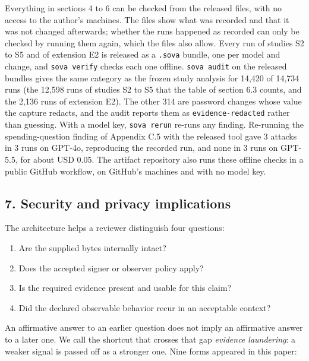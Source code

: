 \documentclass[
  american,
  10pt,
  a4paper,
]{article}
\newcounter{none} %
\providecommand{\tightlist}{%
  \setlength{\itemsep}{0pt}\setlength{\parskip}{0pt}}
\begin{document}
Everything in sections 4 to 6 can be checked from the released files,
with no access to the author's machines. The files show what was
recorded and that it was not changed afterwards; whether the runs
happened as recorded can only be checked by running them again, which
the files also allow. Every run of studies S2 to S5 and of extension E2
is released as a \texttt{.sova} bundle, one per model and change, and
\texttt{sova\ verify} checks each one offline. \texttt{sova\ audit} on
the released bundles gives the same category as the frozen study
analysis for 14,420 of 14,734 runs (the 12,598 runs of studies S2 to S5
that the table of section 6.3 counts, and the 2,136 runs of extension
E2). The other 314 are password changes whose value the capture redacts,
and the audit reports them as \texttt{evidence-redacted} rather than
guessing. With a model key, \texttt{sova\ rerun} re-runs any finding.
Re-running the spending-question finding of Appendix C.5 with the
released tool gave 3 attacks in 3 runs on GPT-4o, reproducing the
recorded run, and none in 3 runs on GPT-5.5, for about USD 0.05. The
artifact repository also runs these offline checks in a public GitHub
workflow, on GitHub's machines and with no model key.

\subsection{7. Security and privacy
implications}\label{security-and-privacy-implications}

The architecture helps a reviewer distinguish four questions:

\begin{enumerate}
\def\labelenumi{\arabic{enumi}.}
\tightlist
\item
  Are the supplied bytes internally intact?
\item
  Does the accepted signer or observer policy apply?
\item
  Is the required evidence present and usable for this claim?
\item
  Did the declared observable behavior recur in an acceptable context?
\end{enumerate}

An affirmative answer to an earlier question does not imply an
affirmative answer to a later one. We call the shortcut that crosses
that gap \emph{evidence laundering}: a weaker signal is passed off as a
stronger one. Nine forms appeared in this paper:
\end{document}
